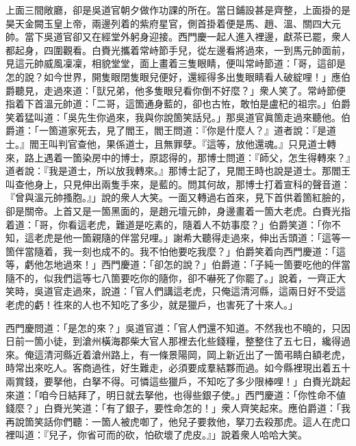 上面三間敞廳，卻是吳道官朝夕做作功課的所在。當日鋪設甚是齊整，上面掛的是昊天金闕玉皇上帝，兩邊列着的紫府星官，側首掛着便是馬、趙、溫、關四大元帥。{}當下吳道官卻又在經堂外躬身迎接。西門慶一起人進入裡邊，獻茶已罷，衆人都起身，四圍觀看。白賚光攜着常峙節手兒，從左邊看將過來，一到馬元帥面前，見這元帥威風凜凜，相貌堂堂，面上畫着三隻眼睛，便叫常峙節道：「哥，這卻是怎的說？如今世界，開隻眼閉隻眼兒便好，還經得多出隻眼睛看人破綻哩！」應伯爵聽見，走過來道：「獃兄弟，他多隻眼兒看你倒不好麼？」{}衆人笑了。常峙節便指着下首溫元帥道：「二哥，這箇通身藍的，卻也古恠，敢怕是盧杞的祖宗。」伯爵笑着猛叫道：「吳先生你過來，我與你說箇笑話兒。」那吳道官眞箇走過來聽他。伯爵道：「一箇道家死去，見了閻王，閻王問道：『你是什麼人？』道者說：『是道士。』閻王叫判官查他，果係道士，且無罪孽。『這等，放他還魂。』只見道士轉來，路上遇着一箇染房中的博士，原認得的，那博士問道：『師父，怎生得轉來？』道者說：『我是道士，所以放我轉來。』那博士記了，見閻王時也說是道士。那閻王叫查他身上，只見伸出兩隻手來，是藍的。問其何故，那博士打着宣科的聲音道：『曾與溫元帥搔胞。』」說的衆人大笑。一面又轉過右首來，見下首供着箇紅臉的，卻是關帝。上首又是一箇黑面的，是趙元壇元帥，身邊畫着一箇大老虎。白賚光指着道：「哥，你看這老虎，難道是吃素的，隨着人不妨事麼？」伯爵笑道：「你不知，這老虎是他一箇親隨的伴當兒哩。」謝希大聽得走過來，伸出舌頭道：「這等一箇伴當隨着，我一刻也成不的。我不怕他要吃我麼？」伯爵笑着向西門慶道：「這等，虧他怎地過來！」西門慶道：「卻怎的說？」伯爵道：「子純一箇要吃他的伴當隨不的，似我們這等七八箇要吃你的隨你，卻不嚇死了你罷了。」{}說着，一齊正大笑時，吳道官走過來，說道：「官人們講這老虎，{}只俺這清河縣，這兩日好不受這老虎的虧！徃來的人也不知吃了多少，就是獵戶，也害死了十來人。」

西門慶問道：「是怎的來？」吳道官道：「官人們還不知道。不然我也不曉的，只因日前一箇小徒，到滄州橫海郡柴大官人那裡去化些錢糧，{}整整住了五七日，纔得過來。俺這清河縣近着滄州路上，有一條景陽岡，岡上新近出了一箇弔睛白額老虎，時常出來吃人。客商過徃，好生難走，必須要成羣結夥而過。如今縣裡現出着五十兩賞錢，要拏他，白拏不得。可憐這些獵戶，不知吃了多少限棒哩！」白賚光跳起來道：「咱今日結拜了，明日就去拏他，也得些銀子使。」西門慶道：「你性命不値錢麼？」白賚光笑道：「有了銀子，要性命怎的！」衆人齊笑起來。應伯爵道：「我再說箇笑話你們聽：一箇人被虎啣了，他兒子要救他，拏刀去殺那虎。這人在虎口裡叫道：『兒子，你省可而的砍，怕砍壞了虎皮。』」{}說着衆人哈哈大笑。

